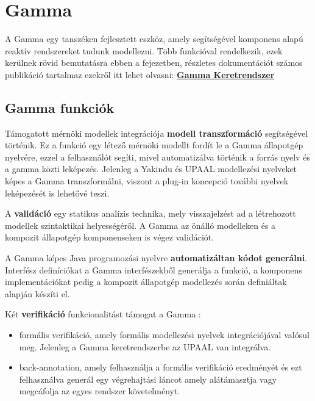 \section{Gamma}

A Gamma egy tanszéken fejlesztett eszköz, amely segítségével komponens alapú reaktív rendszereket tudunk modellezni. Több funkcióval rendelkezik, ezek kerülnek rövid bemutatásra ebben a fejezetben, részletes dokumentációt számos publikáció tartalmaz ezekről itt lehet olvasni: \textbf{\href{https://inf.mit.bme.hu/node/6028}{Gamma Keretrendszer}}
\subsection{Gamma funkciók}
Támogatott mérnöki modellek integrációja \textbf{modell transzformáció}  segítségével történik. Ez a funkció egy létező mérnöki modellt fordít le a Gamma állapotgép nyelvére, ezzel a felhasználót segíti, mivel automatizálva történik a forrás nyelv és a gamma közti leképezés. Jelenleg a Yakindu és UPAAL modellezési nyelveket képes a Gamma transzformálni, viszont a plug-in koncepció további nyelvek leképezését is lehetővé teszi.

A \textbf{validáció} egy statikus analízis technika, mely visszajelzést ad a létrehozott modellek szintaktikai helyességéről. A Gamma az önálló modelleken és a kompozit állapotgép komponenseken is végez validációt.

A Gamma képes Java programozási nyelvre \textbf{automatizáltan kódot generálni}. Interfész definíciókat a Gamma interfészekből generálja a funkció, a komponens implementációkat pedig a kompozit állapotgép modellezés során definiáltak alapján készíti el.

Két \textbf{verifikáció} funkcionalitást támogat a Gamma :
\begin{itemize}
	\item formális verifikáció, amely formális modellezési nyelvek integrációjával valósul meg. Jelenleg a Gamma keretrendszerbe az UPAAL van integrálva.
	\item back-annotation, amely felhasználja a formális verifikáció eredményét és ezt felhasználva  generál egy végrehajtási láncot amely alátámasztja vagy megcáfolja az egyes rendszer követelményt.
\end{itemize}

